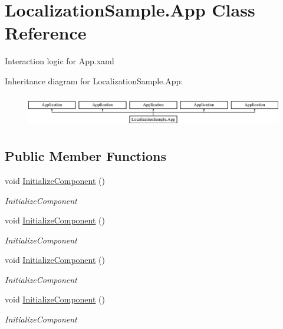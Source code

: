 \hypertarget{class_localization_sample_1_1_app}{}\section{Localization\+Sample.\+App Class Reference}
\label{class_localization_sample_1_1_app}


Interaction logic for App.\+xaml  


Inheritance diagram for Localization\+Sample.\+App\+:\begin{figure}[H]
\begin{center}
\leavevmode
\includegraphics[height=1.445161cm]{dd/de2/class_localization_sample_1_1_app}
\end{center}
\end{figure}
\subsection*{Public Member Functions}
\begin{DoxyCompactItemize}
\item 
void \mbox{\hyperlink{class_localization_sample_1_1_app_aa84c55a5df75b63835973786cf677726}{Initialize\+Component}} ()
\begin{DoxyCompactList}\small\item\em Initialize\+Component \end{DoxyCompactList}\item 
void \mbox{\hyperlink{class_localization_sample_1_1_app_aa84c55a5df75b63835973786cf677726}{Initialize\+Component}} ()
\begin{DoxyCompactList}\small\item\em Initialize\+Component \end{DoxyCompactList}\item 
void \mbox{\hyperlink{class_localization_sample_1_1_app_aa84c55a5df75b63835973786cf677726}{Initialize\+Component}} ()
\begin{DoxyCompactList}\small\item\em Initialize\+Component \end{DoxyCompactList}\item 
void \mbox{\hyperlink{class_localization_sample_1_1_app_aa84c55a5df75b63835973786cf677726}{Initialize\+Component}} ()
\begin{DoxyCompactList}\small\item\em Initialize\+Component \end{DoxyCompactList}\end{DoxyCompactItemize}
